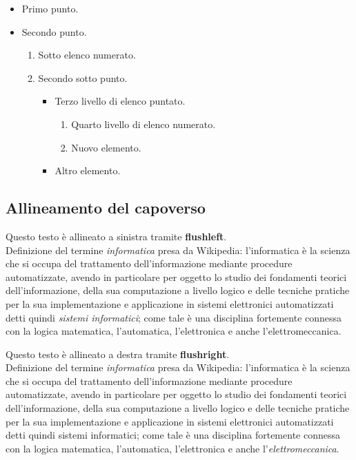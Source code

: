\documentclass[a4paper,12pt,oneside]{book}
\theoremstyle{plain}
\begin{document}
	\begin{itemize}
		\item Primo punto.
		\item Secondo punto.
		\begin{enumerate}
			\item Sotto elenco numerato.
			\item Secondo sotto punto.
			\begin{itemize}
				\item Terzo livello di elenco puntato.
				\begin{enumerate}
					\item Quarto livello di elenco numerato.
					\item Nuovo elemento.
				\end{enumerate}
				\item Altro elemento.
			\end{itemize}
		\end{enumerate}
	\end{itemize}


	\subsection{Allineamento del capoverso}
	\begin{flushleft}
		Questo testo è allineato a sinistra tramite \textbf{flushleft}.\\
		Definizione del termine \textit{informatica} presa da Wikipedia: l'informatica è la scienza che si occupa del trattamento dell'informazione mediante procedure automatizzate, avendo in particolare per oggetto lo studio dei fondamenti teorici dell'informazione, della sua computazione a livello logico e delle tecniche pratiche per la sua implementazione e applicazione in sistemi elettronici automatizzati detti quindi \emph{sistemi informatici}; come tale è una disciplina fortemente connessa con la logica matematica, l'automatica, l'elettronica e anche l'elettromeccanica.
	\end{flushleft}
	
	\begin{flushright}
		Questo testo è allineato a destra tramite \textbf{flushright}.\\
		Definizione del termine \textit{informatica} presa da Wikipedia: l'informatica è la scienza che si occupa del trattamento dell'informazione mediante procedure automatizzate, avendo in particolare per oggetto lo studio dei fondamenti teorici dell'informazione, della sua computazione a livello logico e delle tecniche pratiche per la sua implementazione e applicazione in sistemi elettronici automatizzati detti quindi sistemi informatici; come tale è una disciplina fortemente connessa con la logica matematica, l'automatica, l'elettronica e anche l'\emph{elettromeccanica}.
	\end{flushright}
	
\end{document}
